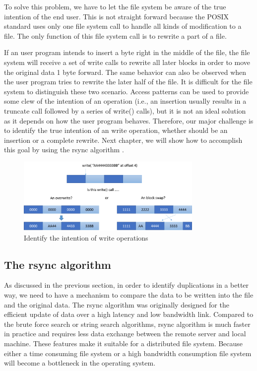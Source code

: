     To solve this problem, we have to let the file system be aware of the true intention of the end user. This is not straight forward because the POSIX standard uses only one file system call to handle all kinds of modification to a file. The only function of this file system call is to rewrite a part of a file.
    
    If an user program intends to insert a byte right in the middle of the file, the file system will receive a set of write calls to rewrite all later blocks in order to move the original data 1 byte forward. The same behavior can also be observed when the user program tries to rewrite the later half of the file. It is difficult for the file system to distinguish these two scenario. Access patterns can be used to provide some clew of the intention of an operation (i.e., an insertion usually results in a truncate call followed by a series of write() calls), but it is not an ideal solution as it depends on how the user program behaves. Therefore, our major challenge is to identify the true intention of an write operation, whether should be an insertion or a complete rewrite. Next chapter, we will show how to accomplish this goal by using the rsync algorithm \cite{rsync_alg}.

\begin{figure}[t]
\centering
\includegraphics[width=0.8\textwidth]{Chapter-4/figs/fig6.png}
\caption{Identify the intention of write operations}
\label{fig:write_intention}
\end{figure}

\subsection{The rsync algorithm}

    As discussed in the previous section, in order to identify duplications in a better way, we need to have a mechanism to compare the data to be written into the file and the original data. The rsync algorithm was originally designed for the efficient update of data over a high latency and low bandwidth link. Compared to the brute force search or string search algorithms, rsync algorithm is much faster in practice and requires less data exchange between the remote server and local machine. These features make it suitable for a distributed file system. Because either a time consuming file system or a high bandwidth consumption file system will become a bottleneck in the operating system.


